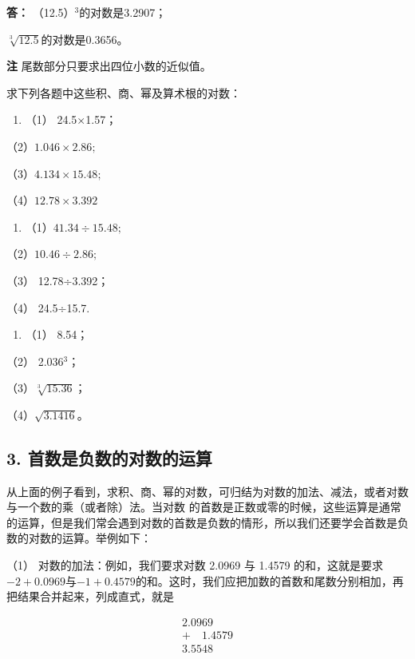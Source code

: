 \textbf{答：} （12.5）\(^{3}\)的对数是3.2907；

\(\sqrt[3]{12.5}\)的对数是0.3656。

\textbf{注} 尾数部分只要求出四位小数的近似值。

求下列各题中这些积、商、幂及算术根的对数：

\begin{enumerate}
\item
  （1） 24.5×1.57；
\end{enumerate}

（2）\(1.046 \times 2.86;\)

（3）\(4.134 \times 15.48;\)

（4）\(12.78 \times 3.392\)

\begin{enumerate}[start=2]
\item
  （1）\(41.34 \div 15.48;\)
\end{enumerate}

（2）\(10.46 \div 2.86;\)

（3） 12.78÷3.392；

（4） 24.5÷15.7.

\begin{enumerate}[start=3]
\item
  （1） 8.54；
\end{enumerate}

（2） 2.036\(^{3}\)；

（3）\(\sqrt[3]{15.36}\)；

（4）\(\sqrt{3.1416}\)。

\subsection{3. 首数是负数的对数的运算}

从上面的例子看到，求积、商、幂的对数，可归结为对数的加法、减法，或者对数与一个数的乘（或者除）法。当对数
的首数是正数或零的时候，这些运算是通常的运算，但是我们常会遇到对数的首数是负数的情形，所以我们还要学会首数是负数的对数的运算。举例如下：

（1） 对数的加法：例如，我们要求对数 2.0969 与 1.4579
的和，这就是要求\(-2+0.0969\)与\(-1+0.4579\)的和。这时，我们应把加数的首数和尾数分别相加，再把结果合并起来，列成直式，就是

\[
\begin{array}{r} 2.0969 \\ + \quad 1.4579 \\ \hline 3.5548 \end{array}
\]

